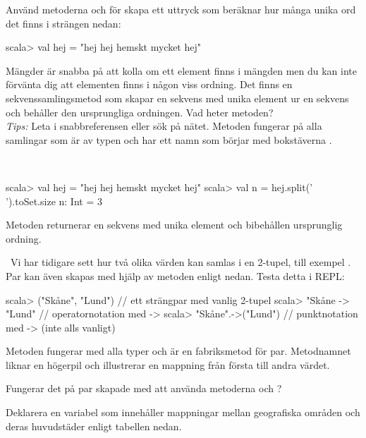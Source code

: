 \Subtask Använd metoderna  och  för skapa ett uttryck som beräknar hur många unika ord det finns i strängen  nedan:
\begin{REPLnonum}
scala> val hej = "hej hej hemskt mycket hej"
\end{REPLnonum}

\Subtask Mängder är snabba på att kolla om ett element finns i mängden men du kan inte förvänta dig att elementen finns i någon viss ordning. Det finns en sekvenssamlingsmetod som skapar en sekvens med unika element ur en sekvens och behåller den ursprungliga ordningen. Vad heter metoden? \\\emph{Tips:} Leta i snabbreferensen eller sök på nätet. Metoden fungerar på alla samlingar som är av typen  och har ett namn som börjar med bokstäverna .

\SOLUTION

\TaskSolved \what~

\SubtaskSolved
\begin{REPL}
scala> val hej = "hej hej hemskt mycket hej"
scala> val n = hej.split(' ').toSet.size
n: Int = 3
\end{REPL}

\SubtaskSolved Metoden  returnerar en sekvens med unika element och bibehållen ursprunglig ordning.

\QUESTEND





\QUESTBEGIN

\Task \what~Vi har tidigare sett hur två olika värden kan samlas i en 2-tupel, till exempel . Par kan även skapas med hjälp av metoden \code{->} enligt nedan. Testa detta i REPL:
\begin{REPL}
scala> ("Skåne", "Lund")          // ett strängpar med vanlig 2-tupel
scala> "Skåne -> "Lund"           // operatornotation med ->
scala> "Skåne".->("Lund")         // punktnotation med -> (inte alls vanligt)
\end{REPL}
Metoden \code{->} fungerar med alla typer och är en fabriksmetod för par. Metodnamnet liknar en högerpil och illustrerar en mappning från första till andra värdet.

\Subtask Fungerar det på par skapade med \code{->} att använda metoderna  och ?


\Subtask Deklarera en variabel  som innehåller mappningar mellan geografiska områden och deras huvudstäder enligt tabellen nedan.

